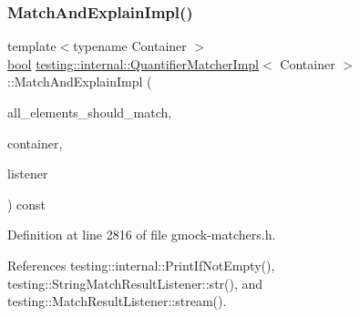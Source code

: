 \mbox{\label{classtesting_1_1internal_1_1QuantifierMatcherImpl_ab8f64532b70f47fc60f7983ebe5cbfc6}} 
\subsubsection{\texorpdfstring{Match\+And\+Explain\+Impl()}{MatchAndExplainImpl()}}
{\footnotesize\ttfamily template$<$typename Container $>$ \\
\hyperlink{classbool}{bool} \hyperlink{classtesting_1_1internal_1_1QuantifierMatcherImpl}{testing\+::internal\+::\+Quantifier\+Matcher\+Impl}$<$ Container $>$\+::Match\+And\+Explain\+Impl (\begin{DoxyParamCaption}\item[{\hyperlink{classbool}{bool}}]{all\+\_\+elements\+\_\+should\+\_\+match,  }\item[{Container}]{container,  }\item[{\hyperlink{classtesting_1_1MatchResultListener}{Match\+Result\+Listener} $\ast$}]{listener }\end{DoxyParamCaption}) const\hspace{0.3cm}{\ttfamily [inline]}}



Definition at line 2816 of file gmock-\/matchers.\+h.



References testing\+::internal\+::\+Print\+If\+Not\+Empty(), testing\+::\+String\+Match\+Result\+Listener\+::str(), and testing\+::\+Match\+Result\+Listener\+::stream().


